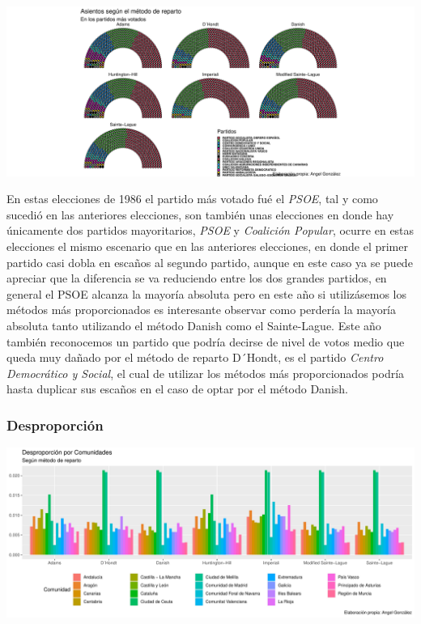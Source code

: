 \documentclass[12pt,a4paper,]{book}
\numberwithin{dummy}{section}
\theoremstyle{ocrenumbox}
\theoremstyle{blacknumex}
\theoremstyle{blacknumbox}
\theoremstyle{ocrenum}
\theoremstyle{ocrenum}
\begin{document}
\begin{center}\includegraphics[width=0.95\linewidth]{figurasR/unnamed-chunk-86-3} \end{center}

En estas elecciones de 1986 el partido más votado fué el \emph{PSOE},
tal y como sucedió en las anteriores elecciones, son también unas
elecciones en donde hay únicamente dos partidos mayoritarios,
\emph{PSOE} y \emph{Coalición Popular}, ocurre en estas elecciones el
mismo escenario que en las anteriores elecciones, en donde el primer
partido casi dobla en escaños al segundo partido, aunque en este caso ya
se puede apreciar que la diferencia se va reduciendo entre los dos
grandes partidos, en general el PSOE alcanza la mayoría absoluta pero en
este año si utilizásemos los métodos más proporcionados es interesante
observar como perdería la mayoría absoluta tanto utilizando el método
Danish como el Sainte-Lague. Este año también reconocemos un partido que
podría decirse de nivel de votos medio que queda muy dañado por el
método de reparto D´Hondt, es el partido \emph{Centro Democrático y
Social}, el cual de utilizar los métodos más proporcionados podría hasta
duplicar sus escaños en el caso de optar por el método Danish.

\hypertarget{desproporciuxf3n-3}{%
\subsubsection{Desproporción}\label{desproporciuxf3n-3}}

\begin{center}\includegraphics[width=0.95\linewidth]{figurasR/unnamed-chunk-87-1} \end{center}
\end{document}

